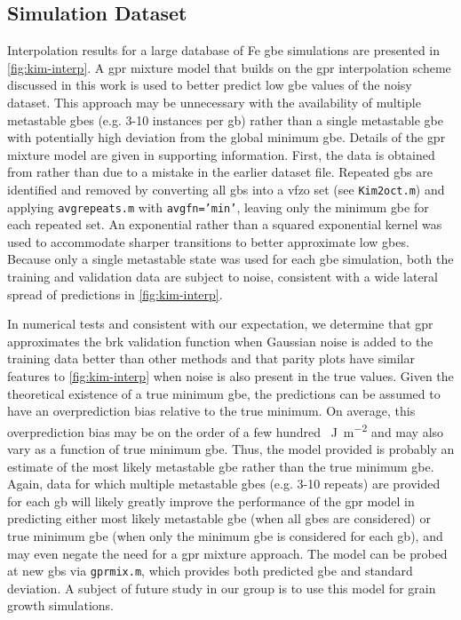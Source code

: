 \documentclass[final,twocolumn,12pt]{elsarticle}
\begin{document}
\subsection{Simulation Dataset}
Interpolation results for a large database of Fe \gls{gbe} simulations \cite{kimPhasefieldModeling3D2014} are presented in \cref{fig:kim-interp}. A \gls{gpr} mixture model that builds on the \gls{gpr} interpolation scheme discussed in this work is used to better predict low \gls{gbe} values of the noisy dataset. This approach may be unnecessary with the availability of multiple metastable \glspl{gbe} (e.g. 3-10 instances per \gls{gb}) rather than a single metastable \gls{gbe} with potentially high deviation from the global minimum \gls{gbe}. Details of the \gls{gpr} mixture model are given in supporting information. First, the data is obtained from \cite{kimPhasefieldModeling3D2014} rather than \cite{kimIdentificationSchemeGrain2011} due to a mistake in the earlier dataset file. Repeated \glspl{gb} are identified and removed by converting all \glspl{gb} into a \gls{vfzo} set (see \texttt{Kim2oct.m}) and applying \texttt{avgrepeats.m} with \texttt{avgfn='min'}, leaving only the minimum \gls{gbe} for each repeated set. An exponential rather than a squared exponential kernel was used to accommodate sharper transitions to better approximate low \glspl{gbe}. Because only a single metastable state was used for each \gls{gbe} simulation, both the training and validation data are subject to noise, consistent with a wide lateral spread of predictions in \cref{fig:kim-interp}.

In numerical tests and consistent with our expectation, we determine that \gls{gpr} approximates the \gls{brk} validation function when Gaussian noise is added to the training data better than other methods and that parity plots have similar features to \cref{fig:kim-interp} when noise is also present in the true values. Given the theoretical existence of a true minimum \gls{gbe}, the predictions can be assumed to have an overprediction bias relative to the true minimum. On average, this overprediction bias may be on the order of a few hundred \SI{}{\J\per\square\meter} and may also vary as a function of true minimum \gls{gbe}. Thus, the model provided is probably an estimate of the most likely metastable \gls{gbe} rather than the true minimum \gls{gbe}. Again, data for which multiple metastable \glspl{gbe} (e.g. 3-10 repeats) are provided for each \gls{gb} will likely greatly improve the performance of the \gls{gpr} model in predicting either most likely metastable \gls{gbe} (when all \glspl{gbe} are considered) or true minimum \gls{gbe} (when only the minimum \gls{gbe} is considered for each \gls{gb}), and may even negate the need for a \gls{gpr} mixture approach. The model can be probed at new \glspl{gb} via \texttt{gprmix.m}, which provides both predicted \gls{gbe} and standard deviation. A subject of future study in our group is to use this model for grain growth simulations.
\end{document}
